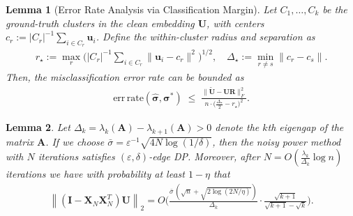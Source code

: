 \documentclass[10pt,a4paper]{amsart}
\newtheorem{lemma}{Lemma}
\begin{document}
\begin{lemma}[Error Rate Analysis via Classification Margin]
\label{lem:kmeans_margin}
Let $C_1,\ldots,C_k$ be the ground-truth clusters in the clean embedding $\mathbf{U}$, with centers 
$c_r := |C_r|^{-1}\sum_{i\in C_r} \mathbf{u}_i$. 
Define the within-cluster radius and separation as
\begin{equation*}
\begin{aligned}
r_\star  := \max_r \Big(|C_r|^{-1}\sum_{i\in C_r}\|\mathbf{u}_i-c_r\|^2\Big)^{1/2}, \quad 
\Delta_\star  := \min_{r\ne s}\|c_r-c_s\|.
\end{aligned}
\end{equation*}
Then, the misclassification error rate can be bounded as 
\begin{equation*}
\begin{aligned}
\mathrm{err\,rate}(\hat{\bm{\sigma}},\bm{\sigma}^\ast)
 \;\le\;
 \frac{\|\widetilde{\mathbf{U}}- \mathbf{U} \mathbf{R}\|^{2}_F}{n \cdot \bigl(\tfrac{\Delta_\star}{2}-r_\star\bigr)^2}.    
\end{aligned}
\end{equation*}
\end{lemma}

\begin{lemma} \label{lem:ref_bound}
Let $\Delta_k=\lambda_{k}(\mathbf{A})-\lambda_{k+1}(\mathbf{A})>0$
denote the $k$th eigengap of the matrix $\mathbf{A}$. If we choose $\bar{\sigma} = \varepsilon^{-1} \sqrt{4 N \log(1/\delta)}$, then the noisy power method with $N$ iterations satisfies $(\varepsilon, \delta)$-edge DP.  Moreover, after $ N = O\left( \frac{\lambda_k}{\Delta_k} \log n  \right) $ iterations we have with probability at least $1-\eta$ that
\begin{equation*} 
\begin{aligned}
     \left\|  (\mathbf{I} - \mathbf{X}_N \mathbf{X}_N^T) \mathbf{U} \right\|_2 =  
     O\bigg( \frac{ \bar{\sigma} \, \left( \sqrt{n} + \sqrt{2 \log\left( {2N}/{\eta} \right)} \right)}{\Delta_k}  \cdot \frac{\sqrt{k+1}}{\sqrt{k+1} - \sqrt{k}} \bigg).
\end{aligned}
\end{equation*}
\end{lemma}
\end{document}
